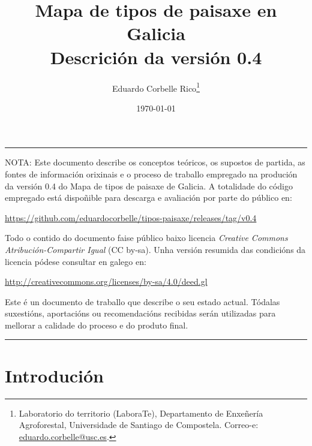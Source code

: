 \documentclass[11pt,a4paper]{article}
\title{Mapa de tipos de paisaxe en Galicia\\Descrición da versión 0.4}
\author{Eduardo Corbelle Rico\thanks{Laboratorio do territorio (LaboraTe), Departamento de Enxeñería Agroforestal, Universidade de Santiago de Compostela. Correo-e: \href{mailto:eduardo.corbelle@usc.es}{eduardo.corbelle@usc.es}.}}
\date{\today}
\begin{document}
\maketitle

\hrule
 \vspace{.2cm}
  \begin{small}
   \noindent NOTA: Este documento describe os conceptos teóricos, os supostos de partida, as fontes de información orixinais e o proceso de traballo empregado na produción da versión 0.4 do Mapa de tipos de paisaxe de Galicia. A totalidade do código empregado está dispoñible para descarga e avaliación por parte do público en:
   \begin{center}
 \url{https://github.com/eduardocorbelle/tipos-paisaxe/releases/tag/v0.4}   
   \end{center}
Todo o contido do documento faise público baixo licencia \emph{Creative Commons Atribución-Compartir Igual} (CC by-sa). Unha versión resumida das condicións da licencia pódese consultar en galego en:
   \begin{center}
 \url{http://creativecommons.org/licenses/by-sa/4.0/deed.gl}
   \end{center}
Este é un documento de traballo que describe o seu estado actual. Tódalas suxestións, aportacións ou recomendacións recibidas serán utilizadas para mellorar a calidade do proceso e do produto final.
  \end{small}
 \vspace{.2cm}
\hrule
\bigskip


\section{Introdución}
\end{document}
